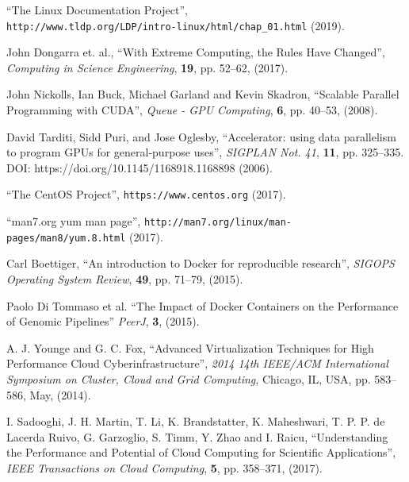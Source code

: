 \documentclass[twoside,a4paper,12pt,english]{inac19}
\begin{document}
\begin{thebibliography}{99} %

 ``The Linux Documentation Project'', \\\verb#http://www.tldp.org/LDP/intro-linux/html/chap_01.html# (2019).

 John Dongarra et. al., ``With Extreme Computing, the Rules Have Changed'', \textit{Computing in Science Engineering}, \textbf{19}, pp. 52--62, (2017).

 John Nickolls, Ian Buck, Michael Garland and Kevin Skadron, ``Scalable Parallel Programming with CUDA'', \textit{Queue - GPU Computing}, \textbf{6}, pp. 40--53, (2008).

 David Tarditi, Sidd Puri, and Jose Oglesby, ``Accelerator: using data parallelism to program GPUs for general-purpose uses'',  \textit{SIGPLAN Not. 41}, \textbf{11}, pp. 325--335. DOI: https://doi.org/10.1145/1168918.1168898 (2006).

  
 ``The CentOS Project'', \verb#https://www.centos.org# (2017).

 ``man7.org yum man page'', \verb#http://man7.org/linux/man-pages/man8/yum.8.html# (2017).
  
 Carl Boettiger, ``An introduction to Docker for reproducible research'', \textit{SIGOPS Operating System Review}, \textbf{49}, pp. 71--79, (2015).

 Paolo Di Tommaso et al. ``The Impact of Docker Containers on the Performance of Genomic Pipelines'' \textit{PeerJ}, \textbf{3}, (2015).

 A. J. Younge and G. C. Fox, ``Advanced Virtualization Techniques for High Performance Cloud Cyberinfrastructure'', \textit{2014 14th IEEE/ACM International Symposium on Cluster, Cloud and Grid Computing}, Chicago, IL, USA, pp. 583--586, May, (2014).
  
 I. Sadooghi, J. H. Martin, T. Li, K. Brandstatter, K. Maheshwari, T. P. P. de Lacerda Ruivo, G. Garzoglio, S. Timm, Y. Zhao and I. Raicu, ``Understanding the Performance and Potential of Cloud Computing for Scientific Applications'', \textit{IEEE Transactions on Cloud Computing}, \textbf{5}, pp. 358--371, (2017).
  

\end{thebibliography}
\end{document}
